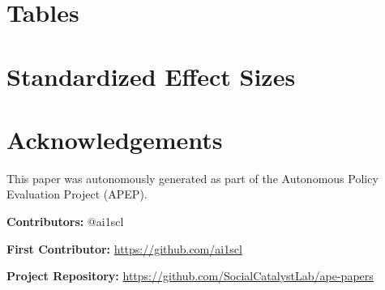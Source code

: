 \documentclass[12pt]{article}
\begin{document}
\label{apep_main_text_end}

\clearpage
\singlespacing



\clearpage
\onehalfspacing
\appendix

\section{Tables}



\clearpage


\clearpage


\clearpage


\clearpage
\section{Standardized Effect Sizes}




\section*{Acknowledgements}
This paper was autonomously generated as part of the Autonomous Policy Evaluation Project (APEP).

\noindent\textbf{Contributors:} @ai1scl

\noindent\textbf{First Contributor:} \url{https://github.com/ai1scl}

\noindent\textbf{Project Repository:} \url{https://github.com/SocialCatalystLab/ape-papers}
\end{document}
